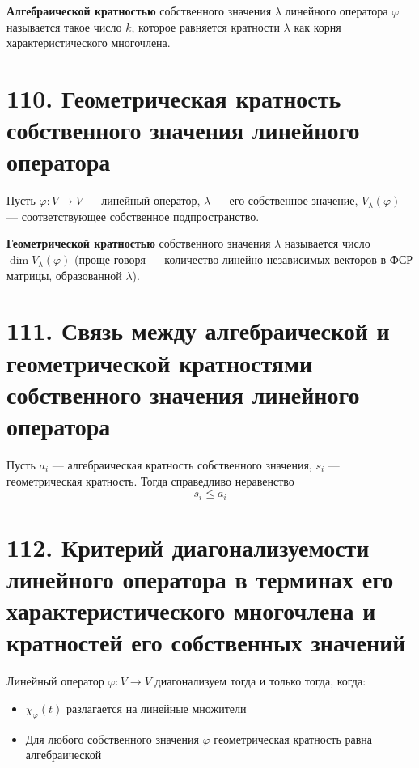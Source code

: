 \documentclass[a4paper, 12pt]{article}
\begin{document}
\textbf{Алгебраической кратностью} собственного значения $\lambda$ линейного оператора $\varphi$ называется такое число $k$, которое равняется кратности $\lambda$ как корня характеристического многочлена.

\section*{110. Геометрическая кратность собственного значения линейного оператора}
Пусть $\varphi: V \rightarrow V$ --- линейный оператор, $\lambda$ --- его собственное значение, $V_\lambda(\varphi)$ --- соответствующее собственное подпространство.

\textbf{Геометрической кратностью} собственного значения $\lambda$ называется число $\dim V_\lambda(\varphi)$ (проще говоря --- количество линейно независимых векторов в ФСР матрицы, образованной $\lambda$).

\section*{111. Связь между алгебраической и геометрической кратностями собственного значения линейного оператора}
Пусть $a_i$ --- алгебраическая кратность собственного значения, $s_i$ --- геометрическая кратность. Тогда справедливо неравенство
\vspace{-4mm}
\[
s_i \leqslant a_i
\]

\section*{112. Критерий диагонализуемости линейного оператора в терминах его характеристического многочлена и кратностей его собственных значений}
Линейный оператор $\varphi: V \rightarrow V$ диагонализуем тогда и только тогда, когда:
\vspace{-2mm}
\begin{itemize}
    \itemsep0em
    \item $\chi_\varphi(t)$ разлагается на линейные множители
    \item Для любого собственного значения $\varphi$ геометрическая кратность равна алгебраической
\end{itemize}
\end{document}
